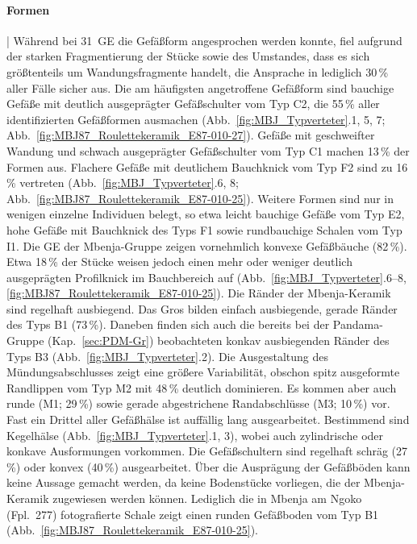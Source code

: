 \paragraph{Formen}\hspace{-.5em}|\hspace{.5em}%
Während bei 31~GE die Gefäßform angesprochen werden konnte, fiel aufgrund der starken Fragmentierung der Stücke sowie des Umstandes, dass es sich größtenteils um Wandungsfragmente handelt, die Ansprache in lediglich 30\,\% aller Fälle sicher aus. Die am häufigsten angetroffene Gefäßform sind bauchige Gefäße mit deutlich ausgeprägter Gefäßschulter vom Typ C2, die 55\,\% aller identifizierten Gefäßformen ausmachen (Abb.~\ref{fig:MBJ_Typverteter}.1, 5, 7; Abb.~\ref{fig:MBJ87_Roulettekeramik_E87-010-27}). Gefäße mit geschweifter Wandung und schwach ausgeprägter Gefäßschulter vom Typ C1 machen 13\,\% der Formen aus. Flachere Gefäße mit deutlichem Bauchknick vom Typ F2 sind zu 16\,\% vertreten (Abb.~\ref{fig:MBJ_Typverteter}.6, 8; Abb.~\ref{fig:MBJ87_Roulettekeramik_E87-010-25}). Weitere Formen sind nur in wenigen einzelne Individuen belegt, so etwa leicht bauchige Gefäße vom Typ E2, hohe Gefäße mit Bauchknick des Typs F1 sowie rundbauchige Schalen vom Typ I1. Die GE der Mbenja-Gruppe zeigen vornehmlich konvexe Gefäßbäuche (82\,\%). Etwa 18\,\% der Stücke weisen jedoch einen mehr oder weniger deutlich ausgeprägten Profilknick im Bauchbereich auf (Abb.~\ref{fig:MBJ_Typverteter}.6--8, \ref{fig:MBJ87_Roulettekeramik_E87-010-25}). Die Ränder der Mbenja-Keramik sind regelhaft ausbiegend. Das Gros bilden einfach ausbiegende, gerade Ränder des Typs B1 (73\,\%). Daneben finden sich auch die bereits bei der Pandama-Gruppe (Kap.~\ref{sec:PDM-Gr}) beobachteten konkav ausbiegenden Ränder des Typs B3 (Abb.~\ref{fig:MBJ_Typverteter}.2). Die Ausgestaltung des Mündungsabschlusses zeigt eine größere Variabilität, obschon spitz ausgeformte Randlippen vom Typ M2 mit 48\,\% deutlich dominieren. Es kommen aber auch runde (M1; 29\,\%) sowie gerade abgestrichene Randabschlüsse (M3; 10\,\%) vor. Fast ein Drittel aller Gefäßhälse ist auffällig lang ausgearbeitet. Bestimmend sind Kegelhälse (Abb.~\ref{fig:MBJ_Typverteter}.1, 3), wobei auch zylindrische oder konkave Ausformungen vorkommen. Die Gefäßschultern sind regelhaft schräg (27\,\%) oder konvex (40\,\%) ausgearbeitet. Über die Ausprägung der Gefäßböden kann keine Aussage gemacht werden, da keine Bodenstücke vorliegen, die der Mbenja-Keramik zugewiesen werden können. Lediglich die in Mbenja am \mbox{Ngoko} (Fpl.~277) fotografierte Schale zeigt einen runden Gefäßboden vom Typ B1 (Abb.~\ref{fig:MBJ87_Roulettekeramik_E87-010-25}).
 

